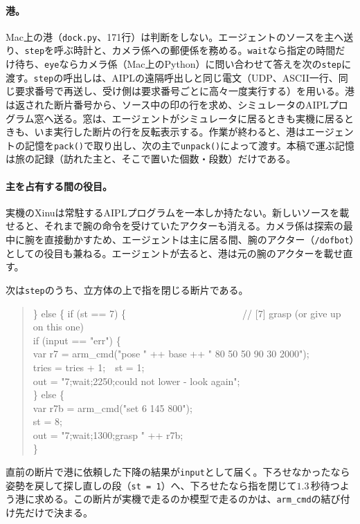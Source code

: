 \documentclass[10pt,letterpaper]{article}
\begin{document}
\paragraph{港。}Mac上の港（\texttt{dock.py}、171行）は判断をしない。エージェントのソースを主へ送り、\texttt{step}を呼ぶ時計と、カメラ係への郵便係を務める。\texttt{wait}なら指定の時間だけ待ち、\texttt{eye}ならカメラ係（Mac上のPython）に問い合わせて答えを次の\texttt{step}に渡す。\texttt{step}の呼出しは、AIPLの遠隔呼出しと同じ電文（UDP、ASCII一行、同じ要求番号で再送し、受け側は要求番号ごとに高々一度実行する）を用いる。港は返された断片番号から、ソース中の印の行を求め、シミュレータのAIPLプログラム窓へ送る。窓は、エージェントがシミュレータに居るときも実機に居るときも、いま実行した断片の行を反転表示する。作業が終わると、港はエージェントの記憶を\texttt{pack()}で取り出し、次の主で\texttt{unpack()}によって渡す。本稿で運ぶ記憶は旅の記録（訪れた主と、そこで置いた個数・段数）だけである。

\paragraph{主を占有する間の役目。}実機のXinuは常駐するAIPLプログラムを一本しか持たない。新しいソースを載せると、それまで腕の命令を受けていたアクターも消える。カメラ係は探索の最中に腕を直接動かすため、エージェントは主に居る間、腕のアクター（\texttt{/dofbot}）としての役目も兼ねる。エージェントが去ると、港は元の腕のアクターを載せ直す。

次は\texttt{step}のうち、立方体の上で指を閉じる断片である。
\begin{quote}\codefont\footnotesize
\} else \{ if (st == 7) \{~~~~~~~~~~~~~~~~~~~~~~~~// [7] grasp (or give up on this one)\\
\hspace*{1em}if (input == "err") \{\\
\hspace*{2em}var r7 = arm\_cmd("pose " ++ base ++ " 80 50 50 90 30 2000");\\
\hspace*{2em}tries = tries + 1;~~st = 1;\\
\hspace*{2em}out = "7;wait;2250;could not lower - look again";\\
\hspace*{1em}\} else \{\\
\hspace*{2em}var r7b = arm\_cmd("set 6 145 800");\\
\hspace*{2em}st = 8;\\
\hspace*{2em}out = "7;wait;1300;grasp " ++ r7b;\\
\hspace*{1em}\}
\end{quote}
直前の断片で港に依頼した下降の結果が\texttt{input}として届く。下ろせなかったなら姿勢を戻して探し直しの段（\texttt{st = 1}）へ、下ろせたなら指を閉じて$1.3$\,秒待つよう港に求める。この断片が実機で走るのか模型で走るのかは、\texttt{arm\_cmd}の結び付け先だけで決まる。
\end{document}
